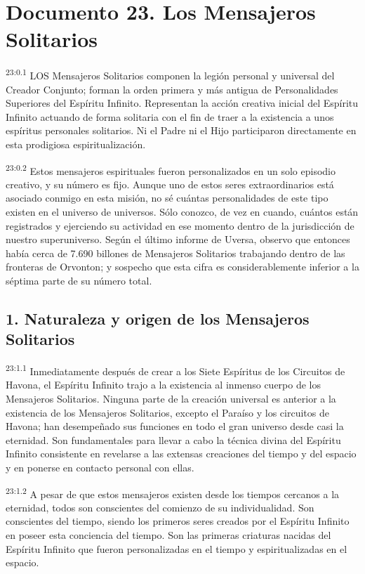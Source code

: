 \chapter{Documento 23. Los Mensajeros Solitarios}
\par
\textsuperscript{23:0.1} LOS Mensajeros Solitarios componen la legión personal y universal del Creador Conjunto; forman la orden primera y más antigua de Personalidades Superiores del Espíritu Infinito. Representan la acción creativa inicial del Espíritu Infinito actuando de forma solitaria con el fin de traer a la existencia a unos espíritus personales solitarios. Ni el Padre ni el Hijo participaron directamente en esta prodigiosa espiritualización.

\par
\textsuperscript{23:0.2} Estos mensajeros espirituales fueron personalizados en un solo episodio creativo, y su número es fijo. Aunque uno de estos seres extraordinarios está asociado conmigo en esta misión, no sé cuántas personalidades de este tipo existen en el universo de universos. Sólo conozco, de vez en cuando, cuántos están registrados y ejerciendo su actividad en ese momento dentro de la jurisdicción de nuestro superuniverso. Según el último informe de Uversa, observo que entonces había cerca de 7.690 billones de Mensajeros Solitarios trabajando dentro de las fronteras de Orvonton; y sospecho que esta cifra es considerablemente inferior a la séptima parte de su número total.

\section*{1. Naturaleza y origen de los Mensajeros Solitarios}
\par
\textsuperscript{23:1.1} Inmediatamente después de crear a los Siete Espíritus de los Circuitos de Havona, el Espíritu Infinito trajo a la existencia al inmenso cuerpo de los Mensajeros Solitarios. Ninguna parte de la creación universal es anterior a la existencia de los Mensajeros Solitarios, excepto el Paraíso y los circuitos de Havona; han desempeñado sus funciones en todo el gran universo desde casi la eternidad. Son fundamentales para llevar a cabo la técnica divina del Espíritu Infinito consistente en revelarse a las extensas creaciones del tiempo y del espacio y en ponerse en contacto personal con ellas.

\par
\textsuperscript{23:1.2} A pesar de que estos mensajeros existen desde los tiempos cercanos a la eternidad, todos son conscientes del comienzo de su individualidad. Son conscientes del tiempo, siendo los primeros seres creados por el Espíritu Infinito en poseer esta conciencia del tiempo. Son las primeras criaturas nacidas del Espíritu Infinito que fueron personalizadas en el tiempo y espiritualizadas en el espacio.

